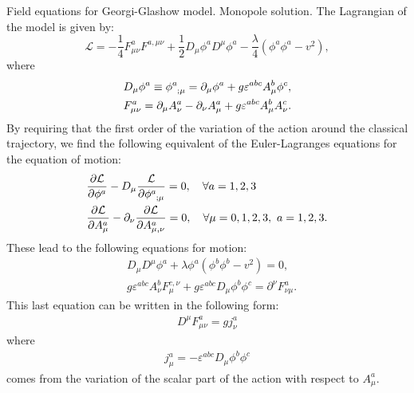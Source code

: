 \begin{section}{Field equations for Georgi-Glashow model. Monopole solution.}
The Lagrangian of the model is given by:
\begin{equation}
  \mathcal{L} = -\frac{1}{4}F_{\mu\nu}^aF^{a,\mu\nu}+\frac{1}{2}D_{\mu}\phi^aD^{\mu}\phi^a-\frac{\lambda}{4}\left(\phi^a\phi^a-v^2\right),\label{eq:GGlagrangian}
\end{equation}
where
\begin{align}
  &D_\mu \phi^a\equiv \phi^a_{\hphantom{a};\mu} = \partial_\mu\phi^a+g\varepsilon^{abc}A_\mu^b\phi^c,\\
  &F_{\mu\nu}^a = \partial_\mu A_\nu^a-\partial_\nu A_\mu^a+g\varepsilon^{abc} A_{\mu}^bA_\nu^c.
\end{align}
By requiring that the first order of the variation of the action
around the classical trajectory, we find the following equivalent of
the Euler-Lagranges equations for the equation of motion:
\begin{align}
  &\frac{\partial \mathcal{L}}{\partial \phi^a} - D_{\mu}\frac{\mathcal{L}}{\partial \phi^a_{\hphantom{a};\mu}} = 0,\quad \forall a = 1,2,3\\
  &\frac{\partial\mathcal{L}}{\partial A_{\mu}^a}-\partial_{\nu}\frac{\partial \mathcal{L}}{\partial A_{\mu,\nu}^a} = 0,\quad \forall \mu=0,1,2,3,\ a = 1,2,3.
\end{align}
These lead to the following equations for motion:
\begin{align}
  &D_{\mu}D^\mu \phi^a +\lambda\phi^a\left(\phi^b\phi^b-v^2\right) = 0\label{eq:motion1},\\
  &g\varepsilon^{abc}A_{\nu}^{b}F_{\mu}^{c,\nu}+g\varepsilon^{abc}D_{\mu}\phi^b\phi^c = \partial^\nu F_{\nu\mu}^a.\label{eq:motion2}
\end{align}
This last equation can be written in the following form:
\begin{align}
  D^{\mu}F_{\mu\nu}^a = gj_{\nu}^a
\end{align}
where
\begin{align}
  j_{\mu}^a = -\varepsilon^{abc}D_{\mu}\phi^b\phi^c
\end{align}
comes from the variation of the scalar part of the action with
respect to $A_{\mu}^a$.


\end{section}
